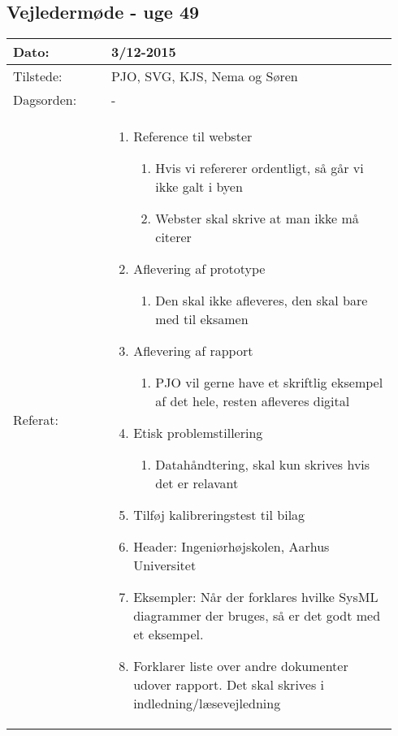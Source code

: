	\subsection{Vejledermøde - uge 49}
	\begin{longtable}{|p{0.24\linewidth}|p{0.7\linewidth}|}
		\hline
		Dato: & 3/12-2015\\ \hline
		Tilstede: & PJO, SVG, KJS, Nema og Søren\\ \hline
		Dagsorden: & - \\ \hline
		Referat: & 
		\begin{enumerate}
			\item Reference til webster 
			\begin{enumerate}
				\item Hvis vi refererer ordentligt, så går vi ikke galt i byen 
				\item Webster skal skrive at man ikke må citerer
			\end{enumerate}
			\item Aflevering af prototype
			\begin{enumerate}
				\item Den skal ikke afleveres, den skal bare med til eksamen
			\end{enumerate}
			\item Aflevering af rapport
			\begin{enumerate}
				\item PJO vil gerne have et skriftlig eksempel af det hele, resten afleveres digital
			\end{enumerate}
			\item Etisk problemstillering
			\begin{enumerate}
				\item Datahåndtering, skal kun skrives hvis det er relavant
			\end{enumerate}
			\item Tilføj kalibreringstest til bilag
			\item Header: Ingeniørhøjskolen, Aarhus Universitet
			\item Eksempler: Når der forklares hvilke SysML diagrammer der bruges, så er det godt med et eksempel. 
			\item Forklarer liste over andre dokumenter udover rapport. Det skal skrives i indledning/læsevejledning
		\end{enumerate}
		\\ \hline
	\end{longtable}
	
	
